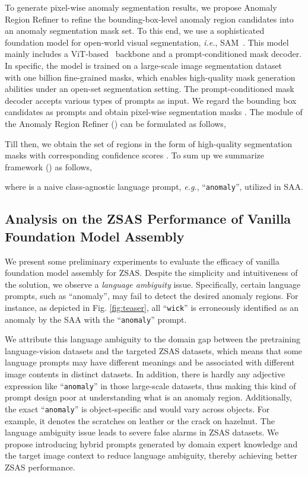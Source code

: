 \documentclass{article}
\begin{document}
To generate pixel-wise anomaly segmentation results, we propose Anomaly Region Refiner to refine the bounding-box-level anomaly region candidates into an anomaly segmentation mask set. To this end, we use a sophisticated foundation model for open-world visual segmentation, \textit{i.e.}, SAM~\cite{kirillov2023segment}. This model mainly includes a ViT-based~\cite{dosovitskiy2021an} backbone and a prompt-conditioned mask decoder. In specific, the model is trained on a large-scale image segmentation dataset~\cite{kirillov2023segment} with one billion fine-grained masks, which enables high-quality mask generation abilities under an open-set segmentation setting. The prompt-conditioned mask decoder accepts various types of prompts as input. We regard the bounding box candidates  as prompts and obtain pixel-wise segmentation masks . The module of the Anomaly Region Refiner () can be formulated as follows,


Till then, we obtain the set of regions in the form of high-quality segmentation masks  with corresponding confidence scores . To sum up we summarize framework () as follows,

where  is a naive class-agnostic language prompt, \textit{e.g.}, ``\verb|anomaly|'', utilized in SAA. 

\subsection{Analysis on the ZSAS Performance of Vanilla Foundation Model Assembly}

We present some preliminary experiments to evaluate the efficacy of vanilla foundation model assembly for ZSAS. Despite the simplicity and intuitiveness of the solution, we observe a \textit{language ambiguity} issue. Specifically, certain language prompts, such as ``anomaly'', may fail to detect the desired anomaly regions. For instance, as depicted in Fig. \ref{fig:teaser}, all ``\verb|wick|'' is erroneously identified as an anomaly by the SAA with the ``\verb|anomaly|'' prompt. 

We attribute this language ambiguity to the domain gap between the pretraining language-vision datasets and the targeted ZSAS datasets, which means that some language prompts may have different meanings and be associated with different image contents in distinct datasets. In addition, there is hardly any adjective expression like ``\verb|anomaly|'' in those large-scale datasets, thus making this kind of prompt design poor at understanding what is an anomaly region. Additionally, the exact ``\verb|anomaly|'' is object-specific and would vary across objects. For example, it denotes the scratches on leather or the crack on hazelnut. The language ambiguity issue leads to severe false alarms in ZSAS datasets. We propose introducing hybrid prompts generated by domain expert knowledge and the target image context to reduce language ambiguity, thereby achieving better ZSAS performance. 
\end{document}
